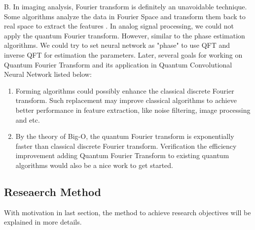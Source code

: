 \documentclass{article}
\begin{document}
B. In imaging analysis, Fourier transform is definitely an unavoidable technique. 
Some algorithms analyze the data in Fourier Space and transform them back to real 
space to extract the features \cite{fourier}.
In analog signal processing, we could not apply the quantum Fourier transform. However,
similar to the phase estimation algorithms. We could try to set neural network 
as "phase" to use QFT and inverse QFT for estimation the parameters. 
Later, several goals for working on Quantum Fourier Transform and its application in 
Quantum Convolutional Neural Network listed below\cite{qml_fcnn}:
\begin{enumerate}
  \item Forming algorithms could possibly enhance the classical
  discrete Fourier transform. Such replacement may improve classical
  algorithms to achieve better performance in feature extraction, 
  like noise filtering, image processing and etc.
  \item By the theory of Big-O, the quantum Fourier transform is exponentially
  faster than classical discrete Fourier transform. Verification the efficiency 
  improvement adding Quantum Fourier Transform to existing quantum 
  algorithms would also be a nice work to get started. 
\end{enumerate}


\subsection{Reseaerch Method}
With motivation in last section, the method to achieve 
research objectives will be explained in more details. 
\end{document}
